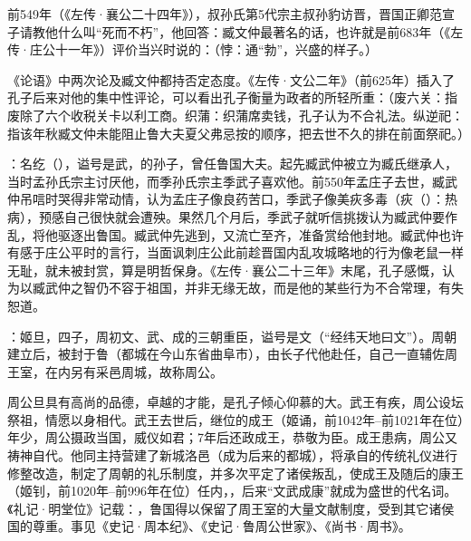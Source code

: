 前549年（《左传·襄公二十四年》），叔孙氏第5代宗主叔孙豹访晋，晋国正卿范宣子请教他什么叫“死而不朽”，他回答：臧文仲最著名的话，也许就是前683年（《左传·庄公十一年》）评价当兴时说的：（悖：通“勃”，兴盛的样子。）

《论语》中两次论及臧文仲都持否定态度。《左传·文公二年》（前625年）插入了孔子后来对他的集中性评论，可以看出孔子衡量为政者的所轻所重：（废六关：指废除了六个收税关卡以利工商。织蒲：织蒲席卖钱，孔子认为不合礼法。纵逆祀：指该年秋臧文仲未能阻止鲁大夫夏父弗忌按的顺序，把去世不久的排在前面祭祀。）

：名纥（），谥号是武，的孙子，曾任鲁国大夫。起先臧武仲被立为臧氏继承人，当时孟孙氏宗主讨厌他，而季孙氏宗主季武子喜欢他。前550年孟庄子去世，臧武仲吊唁时哭得非常动情，认为孟庄子像良药苦口，季武子像美疢多毒（疢（）：热病），预感自己很快就会遭殃。果然几个月后，季武子就听信挑拨认为臧武仲要作乱，将他驱逐出鲁国。臧武仲先逃到，又流亡至齐，准备赏给他封地。臧武仲也许有感于庄公平时的言行，当面讽刺庄公此前趁晋国内乱攻城略地的行为像老鼠一样无耻，就未被封赏，算是明哲保身。《左传·襄公二十三年》末尾，孔子感慨，认为以臧武仲之智仍不容于祖国，并非无缘无故，而是他的某些行为不合常理，有失恕道。

：姬旦，四子，周初文、武、成的三朝重臣，谥号是文（“经纬天地曰文”）。周朝建立后，被封于鲁（都城在今山东省曲阜市），由长子代他赴任，自己一直辅佐周王室，在内另有采邑周城，故称周公。

周公旦具有高尚的品德，卓越的才能，是孔子倾心仰慕的大。武王有疾，周公设坛祭祖，情愿以身相代。武王去世后，继位的成王（姬诵，前1042年--前1021年在位）年少，周公摄政当国，威仪如君；7年后还政成王，恭敬为臣。成王患病，周公又祷神自代。他同主持营建了新城洛邑（成为后来的都城），将承自的传统礼仪进行修整改造，制定了周朝的礼乐制度，并多次平定了诸侯叛乱，使成王及随后的康王（姬钊，前1020年--前996年在位）任内，，后来“文武成康”就成为盛世的代名词。《礼记·明堂位》记载：，鲁国得以保留了周王室的大量文献制度，受到其它诸侯国的尊重。事见《史记·周本纪》、《史记·鲁周公世家》、《尚书·周书》。%

